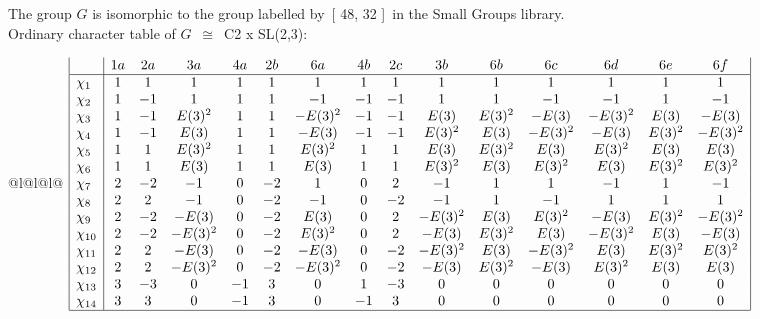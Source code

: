 \documentclass[varwidth=\maxdimen,border=10]{standalone}
\begin{document}
The group $G$ is isomorphic to the group labelled by\ [ 48, 32 ]\ in the Small Groups library.\\
Ordinary character table of $G$\ $\cong$\ C2 x SL(2,3):\\
\begin{center}
\begin{tabular}{@{}l@{}l@{}l@{}}
\hline
\(\begin{array}{|l|cccccccccccccc|}
  & 1a & 2a & 3a & 4a & 2b & 6a & 4b & 2c & 3b & 6b & 6c & 6d & 6e & 6f\\ \hline
\chi_{1} & 1 & 1 & 1 & 1 & 1 & 1 & 1 & 1 & 1 & 1 & 1 & 1 & 1 & 1\\
\chi_{2} & 1 & -1 & 1 & 1 & 1 & -1 & -1 & -1 & 1 & 1 & -1 & -1 & 1 & -1\\
\chi_{3} & 1 & -1 & E(3)^{2} & 1 & 1 & -E(3)^{2} & -1 & -1 & E(3) & E(3)^{2} & -E(3) & -E(3)^{2} & E(3) & -E(3)\\
\chi_{4} & 1 & -1 & E(3) & 1 & 1 & -E(3) & -1 & -1 & E(3)^{2} & E(3) & -E(3)^{2} & -E(3) & E(3)^{2} & -E(3)^{2}\\
\chi_{5} & 1 & 1 & E(3)^{2} & 1 & 1 & E(3)^{2} & 1 & 1 & E(3) & E(3)^{2} & E(3) & E(3)^{2} & E(3) & E(3)\\
\chi_{6} & 1 & 1 & E(3) & 1 & 1 & E(3) & 1 & 1 & E(3)^{2} & E(3) & E(3)^{2} & E(3) & E(3)^{2} & E(3)^{2}\\
\chi_{7} & 2 & -2 & -1 & 0 & -2 & 1 & 0 & 2 & -1 & 1 & 1 & -1 & 1 & -1\\
\chi_{8} & 2 & 2 & -1 & 0 & -2 & -1 & 0 & -2 & -1 & 1 & -1 & 1 & 1 & 1\\
\chi_{9} & 2 & -2 & -E(3) & 0 & -2 & E(3) & 0 & 2 & -E(3)^{2} & E(3) & E(3)^{2} & -E(3) & E(3)^{2} & -E(3)^{2}\\
\chi_{10} & 2 & -2 & -E(3)^{2} & 0 & -2 & E(3)^{2} & 0 & 2 & -E(3) & E(3)^{2} & E(3) & -E(3)^{2} & E(3) & -E(3)\\
\chi_{11} & 2 & 2 & -E(3) & 0 & -2 & -E(3) & 0 & -2 & -E(3)^{2} & E(3) & -E(3)^{2} & E(3) & E(3)^{2} & E(3)^{2}\\
\chi_{12} & 2 & 2 & -E(3)^{2} & 0 & -2 & -E(3)^{2} & 0 & -2 & -E(3) & E(3)^{2} & -E(3) & E(3)^{2} & E(3) & E(3)\\
\chi_{13} & 3 & -3 & 0 & -1 & 3 & 0 & 1 & -3 & 0 & 0 & 0 & 0 & 0 & 0\\
\chi_{14} & 3 & 3 & 0 & -1 & 3 & 0 & -1 & 3 & 0 & 0 & 0 & 0 & 0 & 0\\
\hline
\end{array}\)\\
\end{tabular}
\end{center}
\end{document}
